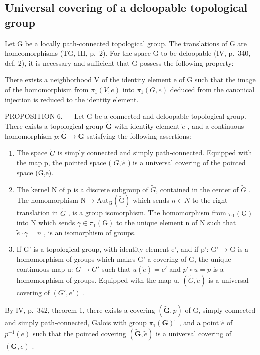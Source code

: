 \subsection{Universal covering of a deloopable topological group}

Let G be a locally path-connected topological group. The translations of G are homeomorphisms (TG, III, p.~2). For the space G to be deloopable (IV, p.~340, def. 2), it is necessary and sufficient that G possess the following property:

There exists a neighborhood V of the identity element e of G such that the image of the homomorphism from \(\pi_{1}(V,e)\) into \(\pi_{1}(G,e)\) deduced from the canonical injection is reduced to the identity element.

PROPOSITION 6. --- Let G be a connected and deloopable topological group. There exists a topological group \(\widetilde{\mathbf{G}}\) with identity element \(\widetilde{e}\) , and a continuous homomorphism \(p\colon \widetilde{\mathbf{G}}\to \mathbf{G}\) satisfying the following assertions:

\begin{enumerate}
\def\labelenumi{\alph{enumi})}
\item
  The space \(\widetilde{G}\) is simply connected and simply path-connected. Equipped with the map p, the pointed space ( \(\widetilde{G},\widetilde{e}\) ) is a universal covering of the pointed space (G,e).
\item
  The kernel N of p is a discrete subgroup of \(\widetilde{G}\), contained in the center of \(\widetilde{G}\) . The homomorphism \(\mathrm{N}\to\mathrm{Aut}_{\mathrm{G}}(\widetilde{\mathrm{G}})\) which sends \(n\in N\) to the right translation in \(\widetilde{G}\) , is a group isomorphism. The homomorphism from \(\pi_{1}(\mathrm{G})\) into N which sends \(\gamma\in\pi_{1}(\mathrm{G})\) to the unique element n of N such that \(\widetilde{e}\cdot\gamma=n\) , is an isomorphism of groups.
\item
  If G' is a topological group, with identity element e', and if p': G' → G is a homomorphism of groups which makes G' a covering of G, the unique continuous map u: \(\widetilde{G} \rightarrow G'\) such that \(u(\widetilde{e}) = e'\) and \(p' \circ u = p\) is a homomorphism of groups. Equipped with the map u, \((\widetilde{G}, \widetilde{e})\) is a universal covering of \((G', e')\) .
\end{enumerate}

By IV, p.~342, theorem 1, there exists a covering \((\widetilde{\mathbf{G}},p)\) of G, simply connected and simply path-connected, Galois with group \(\pi_1(\mathbf{G})^\circ\) , and a point \(\widetilde{e}\) of \(p^{-1}(e)\) such that the pointed covering \((\widetilde{\mathbf{G}},\widetilde{e})\) is a universal covering of \((\mathbf{G},e)\) .

